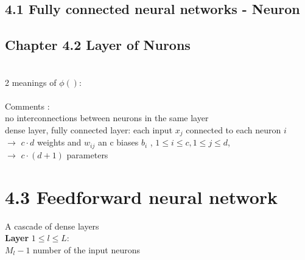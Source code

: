 \subsection{4.1 Fully connected neural networks - Neuron}
\subsection{Chapter 4.2 Layer of Nurons}
\\
2 meanings of $\phi ()$: \\
 \\
Comments : \\
\textbullet no interconnections between neurons in the same layer \\
\textbullet dense layer, fully connected layer:
\qquad \textbullet each input $ x_j$ connected to each neuron $i$ \\
$\rightarrow$ $c \cdot d$ weights and $w_ {ij }$ an c biases $b_i$ , $1 \leq i \leq c, 1 \leq j \leq d$, \\
$\rightarrow$ $ c \cdot (d+1)$ parameters
\section{4.3 Feedforward neural network}
A cascade of dense layers \\
\textbf{Layer } $ 1 \leq l \leq L:$ \\
$M_l -1 $ number of the input neurons \\
 \\
  \\
